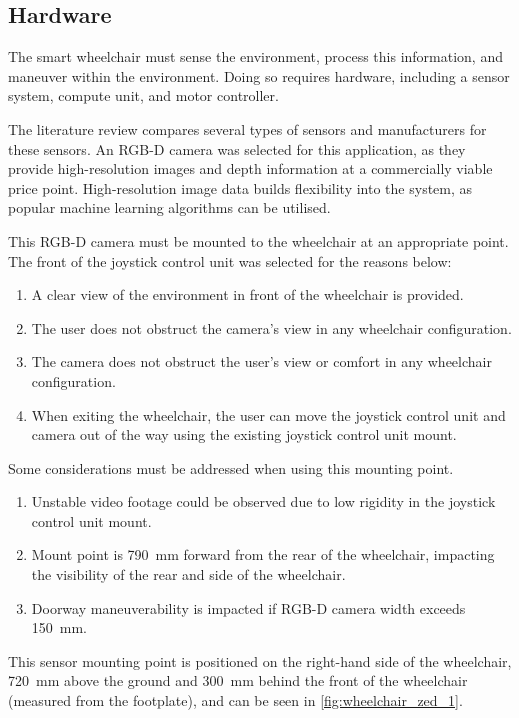 \subsection{Hardware}
The smart wheelchair must sense the environment, process this information,
and maneuver within the environment. Doing so requires hardware, including a
sensor system, compute unit, and motor controller.

The literature review compares several types of sensors and manufacturers for these sensors.
An RGB-D camera was selected for this application, as they provide high-resolution images and depth
information at a commercially viable price point. High-resolution image data builds flexibility into
the system, as popular machine learning algorithms can be utilised.

This RGB-D camera must be mounted to the wheelchair at an appropriate point. The front of the
joystick control unit was selected for the reasons below:
\begin{enumerate}[topsep=0pt,itemsep=-1ex,partopsep=1ex,parsep=1ex]
    \item A clear view of the environment in front of the wheelchair is provided.
    \item The user does not obstruct the camera's view in any wheelchair configuration.
    \item The camera does not obstruct the user's view or comfort in any wheelchair configuration.
    \item When exiting the wheelchair, the user can move the joystick control unit and camera
            out of the way using the existing joystick control unit mount.
\end{enumerate}
Some considerations must be addressed when using this mounting point.
\begin{enumerate}[topsep=0pt,itemsep=-1ex,partopsep=1ex,parsep=1ex]
    \item Unstable video footage could be observed due to low rigidity in the joystick control unit mount.
    \item Mount point is \SI{790}{\milli\metre} forward from the rear of the wheelchair, impacting
            the visibility of the rear and side of the wheelchair.
    \item Doorway maneuverability is impacted if RGB-D camera width exceeds \SI{150}{\milli\metre}.
\end{enumerate}
This sensor mounting point is positioned on the right-hand side of the wheelchair,
\SI{720}{\milli\metre} above the ground and \SI{300}{\milli\metre} behind the
front of the wheelchair (measured from the footplate), and can be seen in \cref{fig:wheelchair_zed_1}.

